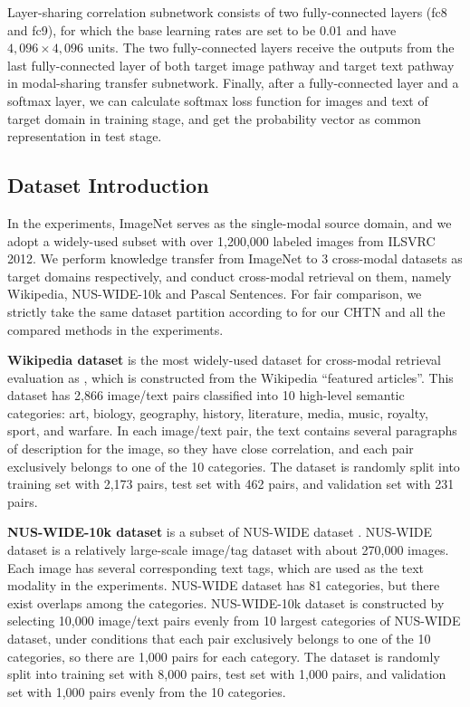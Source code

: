 \documentclass{article}
\begin{document}
Layer-sharing correlation subnetwork consists of two fully-connected layers (fc8 and fc9), for which the base learning rates are set to be 0.01 and have $4,096 \times 4,096$ units. The two fully-connected layers receive the outputs from the last fully-connected layer of both target image pathway and target text pathway in modal-sharing transfer subnetwork. Finally, after a fully-connected layer and a softmax layer, we can calculate softmax loss function for images and text of target domain in training stage, and get the probability vector as common representation in test stage. 


\subsection{Dataset Introduction}

In the experiments, ImageNet serves as the single-modal source domain, and we adopt a widely-used subset with over 1,200,000 labeled images \cite{DBLP:conf/nips/KrizhevskySH12} from ILSVRC 2012.
We perform knowledge transfer from ImageNet to 3 cross-modal datasets as target domains respectively, and conduct cross-modal retrieval on them, namely Wikipedia, NUS-WIDE-10k and Pascal Sentences. For fair comparison, we strictly take the same  dataset partition according to \cite{feng12014cross,DBLP:conf/ijcai/PengHQ16} for our CHTN and all the compared methods in the experiments. 

{\textbf {Wikipedia dataset}} \cite{RasiwasiaMM10SemanticCCA} is the most widely-used dataset for cross-modal retrieval evaluation as \cite{ZhaiTCSVT2014JRL,feng12014cross,DBLP:conf/ijcai/PengHQ16}, which is constructed from the Wikipedia ``featured articles''. This dataset has 2,866 image/text pairs classified into 10 high-level semantic categories: art, biology, geography, history, literature, media, music, royalty, sport, and warfare. In each image/text pair, the text contains several paragraphs of description for the image, so they have close correlation, and each pair exclusively belongs to one of the 10 categories. The dataset is randomly split into training set with 2,173 pairs, test set with 462 pairs, and validation set with 231 pairs. 

{\textbf {NUS-WIDE-10k dataset}} \cite{feng12014cross} is a subset of NUS-WIDE dataset \cite{NUSWIDE}. NUS-WIDE dataset is a relatively large-scale image/tag dataset with about 270,000 images. Each image has several corresponding text tags, which are used as the text modality in the experiments. NUS-WIDE dataset has 81 categories, but there exist overlaps among the categories. NUS-WIDE-10k dataset is constructed by selecting 10,000 image/text pairs evenly from 10 largest categories of NUS-WIDE dataset, under conditions that each pair exclusively belongs to one of the 10 categories, so there are 1,000 pairs for each category.
The dataset is randomly split into training set with 8,000 pairs, test set with 1,000 pairs, and validation set with 1,000 pairs evenly from the 10 categories.
\end{document}

